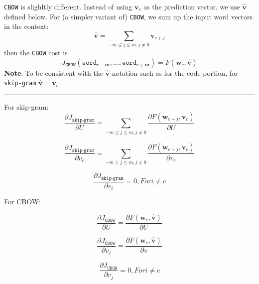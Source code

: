 \documentclass[letter,12pt]{article}
\begin{document}
\noindent \texttt{CBOW} is slighltly different. Instead of using ${\boldsymbol v}_{c}$ as the prediction vector, we use $\hat{\boldsymbol v}$ defined below. For (a simpler variant of) \texttt{CBOW}, we sum up the input word vectors in the context:\\
\begin{equation}
\hat{\boldsymbol v} = \sum_{-m\le j\le m, j\neq0}{\boldsymbol v}_{c+j}
\end{equation}
then the \texttt{CBOW} cost is 
\begin{equation}
J_{\texttt{CBOW}}(\texttt{word}_{c-\textbf{m}} ,...,\texttt{word}_{c+\textbf{m}}) = F({\boldsymbol w}_{c}, \hat{\boldsymbol v})
\end{equation}
\noindent\textbf{Note}: To be consistent with the $\hat{\boldsymbol v}$ notation such as for the code portion, for \texttt{skip-gram} $\hat{\boldsymbol v} = {\boldsymbol v_{c}}$

\vspace{5mm}
\noindent\rule{\textwidth}{0.4pt}\vspace{5mm}



\noindent For skip-gram:
\begin{equation}
\frac {\partial {J_{\texttt{skip-gram}}}} {\partial U}  =   \sum_{-m\le j\le m, j\neq0}\frac {\partial{ F({\boldsymbol w}_{c+j}, {\boldsymbol v}_{c})}}{\partial {U}} 
\end{equation}

\begin{equation}
\frac {\partial {J_{\texttt{skip-gram}}}} {\partial v_{c}}  =   \sum_{-m\le j\le m, j\neq0}\frac {\partial{ F({\boldsymbol w}_{c+j}, {\boldsymbol v}_{c})}}{\partial {v}_{c}} 
\end{equation}

\begin{equation}
\frac {\partial {J_{\texttt{skip-gram}}}} {\partial v_{i}}  =  0 , For i \neq c
\end{equation}




\noindent For CBOW:

\begin{equation}
\frac {\partial {J_{\texttt{CBOW}}}} {\partial U}  = \frac {\partial{ F({\boldsymbol w}_{c}, {\boldsymbol {\hat{v}}})}} {\partial {U}} 
\end{equation}

\begin{equation}
\frac {\partial {J_{\texttt{CBOW}}}} {\partial {v}_{j}}  = \frac {\partial{ F({\boldsymbol w}_{c}, {\boldsymbol {\hat{v}}})}} {\partial {v}} 
\end{equation}

\begin{equation}
\frac {\partial {J_{\texttt{CBOW}}}} {\partial v_{j}}  =  0 , For i \neq c
\end{equation}
\end{document}
